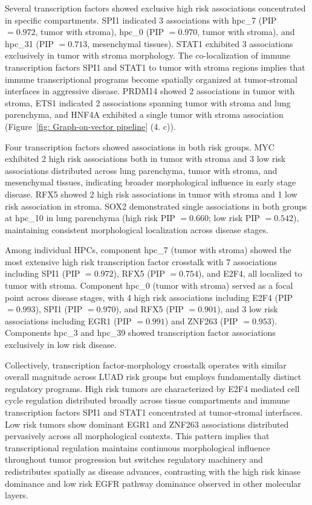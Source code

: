 \documentclass[pdflatex,article,12pt]{article}
\begin{document}
Several transcription factors showed exclusive high risk associations concentrated in specific compartments. SPI1 indicated 3 associations with hpc\_7 (PIP $= 0.972$, tumor with stroma), hpc\_0 (PIP $= 0.970$, tumor with stroma), and hpc\_31 (PIP $= 0.713$, mesenchymal tissues). STAT1 exhibited 3 associations exclusively in tumor with stroma morphology. The co-localization of immune transcription factors SPI1 and STAT1 to tumor with stroma regions implies that immune transcriptional programs become spatially organized at tumor-stromal interfaces in aggressive disease. PRDM14 showed 2 associations in tumor with stroma, ETS1 indicated 2 associations spanning tumor with stroma and lung parenchyma, and HNF4A exhibited a single tumor with stroma association (Figure~\ref{fig: Graph-on-vector pipeline} (4. c)).

Four transcription factors showed associations in both risk groups. MYC exhibited 2 high risk associations both in tumor with stroma and 3 low risk associations distributed across lung parenchyma, tumor with stroma, and mesenchymal tissues, indicating broader morphological influence in early stage disease. RFX5 showed 2 high risk associations in tumor with stroma and 1 low risk association in stroma. SOX2 demonstrated single associations in both groups at hpc\_10 in lung parenchyma (high risk PIP $= 0.660$; low risk PIP $= 0.542$), maintaining consistent morphological localization across disease stages.

Among individual HPCs, component hpc\_7 (tumor with stroma) showed the most extensive high risk transcription factor crosstalk with 7 associations including SPI1 (PIP $= 0.972$), RFX5 (PIP $= 0.754$), and E2F4, all localized to tumor with stroma. Component hpc\_0 (tumor with stroma) served as a focal point across disease stages, with 4 high risk associations including E2F4 (PIP $= 0.993$), SPI1 (PIP $= 0.970$), and RFX5 (PIP $= 0.901$), and 3 low risk associations including EGR1 (PIP $= 0.991$) and ZNF263 (PIP $= 0.953$). Components hpc\_3 and hpc\_39 showed transcription factor associations exclusively in low risk disease.

Collectively, transcription factor-morphology crosstalk operates with similar overall magnitude across LUAD risk groups but employs fundamentally distinct regulatory programs. High risk tumors are characterized by E2F4 mediated cell cycle regulation distributed broadly across tissue compartments and immune transcription factors SPI1 and STAT1 concentrated at tumor-stromal interfaces. Low risk tumors show dominant EGR1 and ZNF263 associations distributed pervasively across all morphological contexts. This pattern implies that transcriptional regulation maintains continuous morphological influence throughout tumor progression but switches regulatory machinery and redistributes spatially as disease advances, contrasting with the high risk kinase dominance and low risk EGFR pathway dominance observed in other molecular layers.
\end{document}
